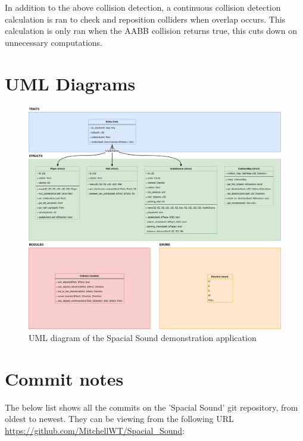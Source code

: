 \documentclass{article}
\begin{document}
\begin{itemize}
    \medskip 

    In addition to the above collision detection, a continuous collision detection calculation is ran to check and reposition colliders when overlap occurs. This calculation is only ran when the AABB collision returns true, this cuts down on unnecessary computations.

\end{itemize}

\section*{UML Diagrams}

\begin{figure}[H]
    \includegraphics[width=\linewidth]{spacial_sound.png}
    \caption{UML diagram of the Spacial Sound demonstration application}
\end{figure}

\section*{Commit notes}

The below list shows all the commits on the 'Spacial Sound' git repository, from oldest to newest. They can be viewing from the following URL \url{https://github.com/MitchellWT/Spacial_Sound}:
\end{document}

